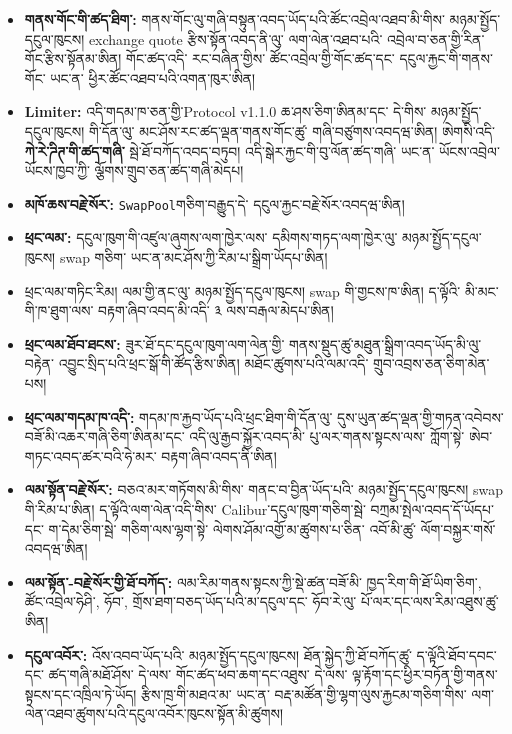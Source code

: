 \documentclass[11pt]{article}
\begin{document}
\begin{itemize}[leftmargin=*]
\item \textbf{གནས་གོང་གི་ཚད་ཐིག་:} གནས་གོང་ལུ་གཞི་བསྟུན་འབད་ཡོད་པའི་ཚོང་འབྲེལ་འཐབ་མི་གིས་ མཉམ་སྤྱོད་དངུལ་ཁུངས། exchange quote རྩིས་སྟོན་འབད་ནི་ལུ་ ལག་ལེན་འཐབ་པའི་ འབྲེལ་བ་ཅན་གྱི་རིན་གོང་རྩིས་སྟོནམ་ཨིན། གོང་ཚད་འདི་ རང་བཞིན་གྱིས་ ཚོང་འབྲེལ་གྱི་གོང་ཚད་དང་ དངུལ་རྐྱང་གི་གནས་གོང་ ཡང་ན་ ཕྱིར་ཚོང་འཐབ་པའི་འགན་ཁུར་ཨིན།
\item \textbf{Limiter:} འདི་གདམ་ཁ་ཅན་གྱི་Protocol v1.1.0 ཆ་ཤས་ཅིག་ཨིནམ་དང་ དེ་གིས་ མཉམ་སྤྱོད་དངུལ་ཁུངས། གི་དོན་ལུ་ མང་ཤོས་རང་ཚད་ལྡན་གནས་གོང་ཚུ་ གཞི་བཙུགས་འབདཝ་ཨིན། ཨེགསི་འདི་ \textbf{ཀེ་རེ་ཌིཊ་གི་ཚད་གཞི་} སྦེ་ཐོ་བཀོད་འབད་བཏུབ། འདི་སྒེར་རྐྱང་གི་བུ་ལོན་ཚད་གཞི་ ཡང་ན་ ཡོངས་འབྲེལ་ཡོངས་ཁྱབ་ཀྱི་ ལྕོགས་གྲུབ་ཅན་ཚད་གཞི་མེདཔ།
\item \textbf{མཁོ་ཆས་བརྗེ་སོར་:} \texttt{SwapPool}གཅིག་བརྒྱུད་དེ་ དངུལ་རྐྱང་བརྗེ་སོར་འབདཝ་ཨིན།
\item \textbf{ཕྲང་ལམ་:} དངུལ་ཁུག་གི་འཛུལ་ཞུགས་ལག་ཁྱེར་ལས་ དམིགས་གཏད་ལག་ཁྱེར་ལུ་ མཉམ་སྤྱོད་དངུལ་ཁུངས། swap གཅིག་ ཡང་ན་མང་ཤོས་ཀྱི་རིམ་པ་སྒྲིག་ཡོདཔ་ཨིན།
\item ཕྲང་ལམ་གཏིང་རིམ། ལམ་གྱི་ནང་ལུ་ མཉམ་སྤྱོད་དངུལ་ཁུངས། swap གི་གྱངས་ཁ་ཨིན། ད་ལྟོའི་ མི་མང་གི་ཁ་ཐུག་ལས་ བརྟག་ཞིབ་འབད་མི་འདི་ ༣ ལས་བརྒལ་མེདཔ་ཨིན།
\item \textbf{ཕྲང་ལམ་ཐོབ་ཐངས་:} ཟུར་ཐོ་དང་དངུལ་ཁུག་ལག་ལེན་གྱི་ གནས་སྡུད་ཚུ་མཐུན་སྒྲིག་འབད་ཡོད་མི་ལུ་བརྟེན་ འབྱུང་སྲིད་པའི་ཕྲང་སྒོ་གི་ཚོད་རྩིས་ཨིན། མཐོང་ཚུགས་པའི་ལམ་འདི་ གྲུབ་འབྲས་ཅན་ཅིག་མེན་པས།
\item \textbf{ཕྲང་ལམ་གདམ་ཁ་འདི་:} གདམ་ཁ་རྐྱབ་ཡོད་པའི་ཕྲང་ཐིག་གི་དོན་ལུ་ དུས་ཡུན་ཚད་ལྡན་གྱི་གཏན་འབེབས་བཟོ་མི་འཆར་གཞི་ཅིག་ཨིནམ་དང་ འདི་ལུ་རྒྱབ་སྐྱོར་འབད་མི་ པུ་ལར་གནས་སྟངས་ལས་ ཀློག་སྟེ་ ཨེབ་གཏང་འབད་ཚར་བའི་ཧེ་མར་ བརྟག་ཞིབ་འབད་ནི་ཨིན།
\item \textbf{ལམ་སྟོན་བརྗེ་སོར་:} བཅའ་མར་གཏོགས་མི་གིས་ གནང་བ་བྱིན་ཡོད་པའི་ མཉམ་སྤྱོད་དངུལ་ཁུངས། swap གི་རིམ་པ་ཨིན། ད་ལྟོའི་ལག་ལེན་འདི་གིས་ Calibur་དངུལ་ཁུག་གཅིག་སྦེ་ བཀྲམ་སྤེལ་འབད་དོ་ཡོདཔ་དང་ ག་དེམ་ཅིག་སྦེ་ གཅིག་ལས་ལྷག་སྟེ་ ལེགས་ཤོམ་འགྱོ་མ་ཚུགས་པ་ཅིན་ འབོ་མི་ཚུ་ ལོག་བསྐྱར་གསོ་འབདཝ་ཨིན།
\item \textbf{ལམ་སྟོན་-བརྗེ་སོར་གྱི་ཐོ་བཀོད་:} ལམ་རིམ་གནས་སྟངས་ཀྱི་སྡེ་ཚན་བཟོ་མི་ ཁྱད་རིག་གི་ཐོ་ཡིག་ཅིག་, ཚོང་འབྲེལ་ཧེཤི་, ཧོབ་, གྲོས་ཐག་བཅད་ཡོད་པའི་མ་དངུལ་དང་ ཧོབ་རེ་ལུ་ པོ་ལར་དང་ལས་རིམ་འཐུས་ཚུ་ཨིན།
\item \textbf{དངུལ་འབོར་:} འོས་འབབ་ཡོད་པའི་ མཉམ་སྤྱོད་དངུལ་ཁུངས། ཐོན་སྐྱེད་ཀྱི་ཐོ་བཀོད་ཚུ་ ད་ལྟོའི་ཐོབ་དབང་དང་ ཚད་གཞི་མཐོ་ཤོས་ དེ་ལས་ གོང་ཚད་ཕབ་ཆག་དང་འཐུས་ དེ་ལས་ ལྟ་རྟོག་དང་ཕྱིར་བཏོན་གྱི་གནས་སྟངས་དང་འཁྲིལ་ཏེ་ཡོད། རྩིས་ཁྲ་གི་མཐའ་མ་ ཡང་ན་ བརྡ་མཚོན་གྱི་ལྷག་ལུས་རྐྱངམ་གཅིག་གིས་ ལག་ལེན་འཐབ་ཚུགས་པའི་དངུལ་འབོར་ཁུངས་སྟོན་མི་ཚུགས།

\end{itemize}
\end{document}
